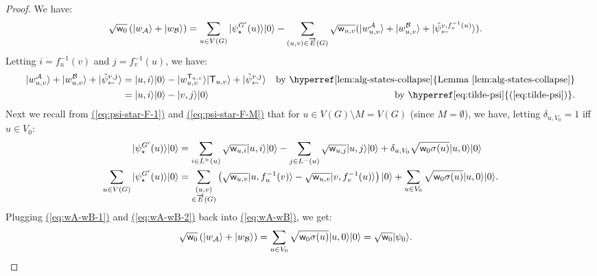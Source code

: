 \documentclass{article}
\newcommand{\eq}[1]{\hyperref[eq:#1]{(\ref*{eq:#1})}}
\newcommand{\lem}[1]{\hyperref[lem:#1]{Lemma~\ref*{lem:#1}}}
\def\ket#1{{\lvert}#1\rangle}
\renewcommand{\>}{\rangle}
\newcommand{\<}{\langle}
\renewcommand{\(}{\left(}
\renewcommand{\)}{\right)}
\def\w{{\sf w}}
\begin{document}
\begin{proof}
We have:
\begin{align}
\sqrt{\w_0}\left(\ket{w_{\cal A}}+\ket{w_{\cal B}}\right) &= \sum_{u\in V(G)}\ket{\psi_{\star}^{G'}(u)}\ket{0}-\sum_{(u,v)\in\overrightarrow{E}(G)}\sqrt{\w_{u,v}}(\ket{w_{u,v}^{\cal A}}+\ket{w_{u,v}^{\cal B}}+\ket{\tilde\psi_{\leftarrow}^{v,f_v^{-1}(u)}}).\label{eq:wA-wB}
\end{align}
Letting $i=f_u^{-1}(v)$ and $j=f_v^{-1}(u)$, we have:
\begin{equation}
\begin{aligned}
\ket{w_{u,v}^{\cal A}}+\ket{w_{u,v}^{\cal B}}+\ket{\tilde\psi_{\leftarrow}^{v,j}}
&=\ket{u,i}\ket{0}-\ket{w_{u,v}^{{\sf T}_{u,v}}}\ket{{\sf T}_{u,v}}+\ket{\tilde\psi_{\leftarrow}^{v,j}}    & \mbox{by \lem{alg-states-collapse}}\\
 &= \ket{u,i}\ket{0}-\ket{v,j}\ket{0} & \mbox{by \eq{tilde-psi}}.
\end{aligned}\label{eq:wA-wB-1}
\end{equation}
Next we recall from \eq{psi-star-F-1} and \eq{psi-star-F-M} that for $u\in V(G)\setminus M=V(G)$ (since $M=\emptyset$), we have, letting $\delta_{u,V_0}=1$ iff $u\in V_0$:
\begin{equation}
\begin{split}
\ket{\psi_{\star}^{G'}(u)}\ket{0} 
&=\sum_{i\in L^+(u)}\sqrt{\w_{u,i}}\ket{u,i}\ket{0} - \sum_{j\in L^-(u)}\sqrt{\w_{u,j}}\ket{u,j}\ket{0}+\delta_{u,V_0}\sqrt{\w_0\sigma(u)}\ket{u,0}\ket{0}\\
\sum_{u\in V(G)}\ket{\psi_{\star}^{G'}(u)}\ket{0} 
&= \sum_{\substack{(u,v)\\ \in\overrightarrow{E}(G)}}\left(\sqrt{\w_{u,v}}\ket{u,f_u^{-1}(v)}-\sqrt{\w_{u,v}}\ket{v,f_v^{-1}(u)}\right)\ket{0}+\sum_{u\in V_0}\sqrt{\w_0\sigma(u)}\ket{u,0}\ket{0}.
\end{split}\label{eq:wA-wB-2}
\end{equation}
Plugging \eq{wA-wB-1} and \eq{wA-wB-2} back into \eq{wA-wB}, we get:
\begin{align*}
\sqrt{\w_0}\left(\ket{w_{\cal A}}+\ket{w_{\cal B}}\right) &= \sum_{u\in V_0}\sqrt{\w_0\sigma(u)}\ket{u,0}\ket{0}=\sqrt{\w_0}\ket{\psi_0}.\qedhere
\end{align*}
\end{proof}
\end{document}
